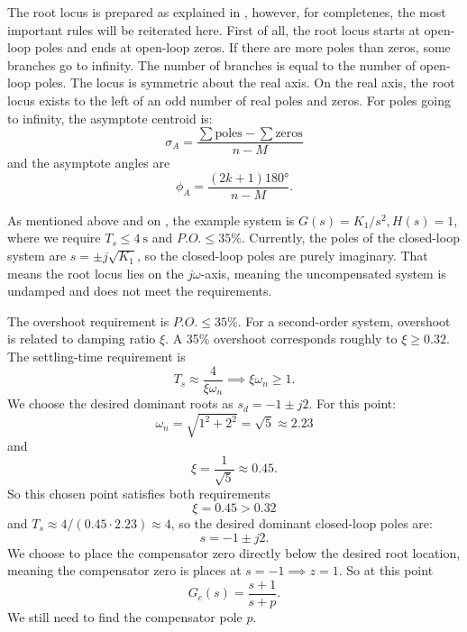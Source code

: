 The root locus is prepared as explained in , however, for completenes, the most important rules will be reiterated here.
First of all, the root locus starts at open-loop poles and ends at open-loop zeros.
If there are more poles than zeros, some branches go to infinity.
The number of branches is equal to the number of open-loop poles.
The locus is symmetric about the real axis.
On the real axis, the root locus exists to the left of an odd number of real poles and zeros.
For poles going to infinity, the asymptote centroid is:
\begin{equation*}
  \sigma_A = \frac{\sum \text{poles} - \sum \text{zeros}}{n - M}
\end{equation*}
and the asymptote angles are
\begin{equation*}
  \phi_A = \frac{\left( 2 k + 1 \right) \ang{180} }{n -M}
.\end{equation*}

As mentioned above and on , the example system is $G(s) = K_1 / s^2, H(s) = 1$, where we require $T_s \leq \qty{4}{\s}$ and $P.O. \leq 35\%$.
Currently, the poles of the closed-loop system are $s = \pm j \sqrt{K_1}$, so the closed-loop poles are purely imaginary.
That means the root locus lies on the $j\omega$-axis, meaning the uncompensated system is undamped and does not meet the requirements.

The overshoot requirement is $P.O. \leq 35\%$.
For a second-order system, overshoot is related to damping ratio $\xi$.
A 35\% overshoot corresponds roughly to $\xi \geq \num{0,32}$.
The settling-time requirement is
\begin{equation*}
  T_s \approx \frac{4}{\xi \omega_n} \implies \xi \omega_n \geq 1
.\end{equation*}
We choose the desired dominant roots as $s_d = -1 \pm j2$.
For this point:
\begin{equation*}
  \omega_n = \sqrt{1^2 + 2^2} = \sqrt{5} \approx \num{2,23} 
\end{equation*}
and
\begin{equation*}
  \xi = \frac{1}{\sqrt{5}} \approx \num{0,45} 
.\end{equation*}
So this chosen point satisfies both requirements
\begin{equation*}
  \xi = \num{0,45} > \num{0,32} 
\end{equation*}
and $T_s \approx 4 / (\num{0,45} \cdot \num{2,23} ) \approx 4$, so the desired dominant closed-loop poles are:
\begin{equation*}
  s = -1 \pm j2
.\end{equation*}
We choose to place the compensator zero directly below the desired root location, meaning the compensator zero is places at $s = -1 \implies z = 1$.
So at this point
\begin{equation*}
  G_c(s) = \frac{s + 1}{s + p}
.\end{equation*}
We still need to find the compensator pole $p$.

